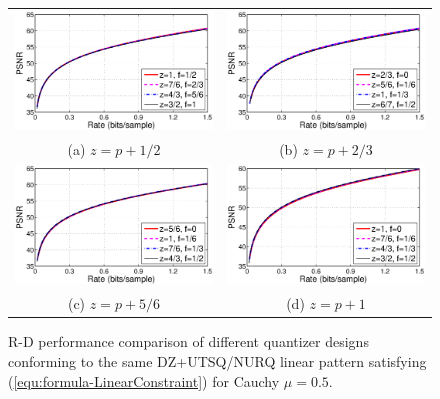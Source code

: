 \documentclass[smallabstract,smallcaptions]{dccpaper}
\begin{document}
\begin{figure}[tp]
\begin{center}
\begin{tabular}{cc}
\includegraphics[width = 0.5\linewidth]{Figures/section4/RD_Cauchy_mu=0_5_z=p+0_5} &
\includegraphics[width = 0.5\linewidth]{Figures/section4/RD_Cauchy_mu=0_5_z=p+0_67} \\
{\small (a) $z=p+1/2$} & {\small (b) $z=p+2/3$} \\
\includegraphics[width = 0.5\linewidth]{Figures/section4/RD_Cauchy_mu=0_5_z=p+0_83} &
\includegraphics[width = 0.5\linewidth]{Figures/section4/RD_Cauchy_mu=0_5_z=p+1} \\
{\small (c) $z=p+5/6$} & {\small (d) $z=p+1$} 
\end{tabular}
\end{center}
\vspace{-20pt}
\caption{\label{fig:RD_same_pattern}
R-D performance comparison of different quantizer designs conforming to the same DZ+UTSQ/NURQ linear pattern satisfying (\ref{equ:formula-LinearConstraint}) for Cauchy $\mu=0.5$.}
\end{figure} 
\end{document}
